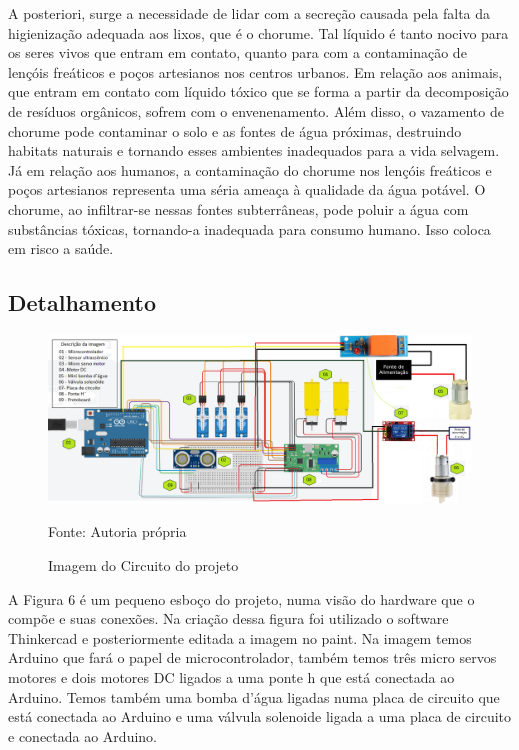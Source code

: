 A posteriori, surge a necessidade de lidar com a secreção causada pela falta da higienização adequada aos lixos, que é o chorume. Tal líquido é tanto nocivo para os seres vivos que entram em contato, quanto para com a contaminação de lençóis freáticos e poços artesianos nos centros urbanos. Em relação aos animais, que entram em contato com líquido tóxico que se forma a partir da decomposição de resíduos orgânicos, sofrem com o  envenenamento. Além disso, o vazamento de chorume pode contaminar o solo e as fontes de água próximas, destruindo habitats naturais e tornando esses ambientes inadequados para a vida selvagem. Já em relação aos humanos, a contaminação do chorume nos lençóis freáticos e poços artesianos representa uma séria ameaça à qualidade da água potável. O chorume, ao infiltrar-se nessas fontes subterrâneas, pode poluir a água com substâncias tóxicas, tornando-a inadequada para consumo humano. Isso coloca em risco a saúde.

\subsection{Detalhamento}
 \begin{figure}[H]
    \caption{Imagem do Circuito do projeto}
    \label{fig:sensor}
    \begin{center}
        
        \includegraphics[scale=0.5]{circuito.png}
        
        Fonte: Autoria própria
    \end{center}
\end{figure}

A Figura 6 é um pequeno esboço do projeto, numa visão do hardware que o compõe e suas conexões. Na criação dessa figura foi utilizado o software Thinkercad e posteriormente editada a imagem no paint. Na imagem temos Arduino que fará o papel de microcontrolador, também temos três micro servos motores e dois motores DC ligados a uma ponte h que está conectada ao Arduino. Temos também uma bomba d'água ligadas numa placa de circuito que está conectada ao Arduino e uma válvula solenoide ligada a uma placa de circuito e conectada ao Arduino.

